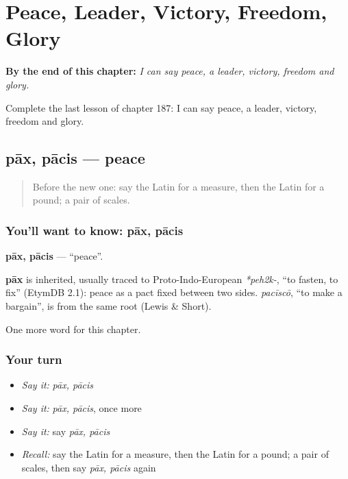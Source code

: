 
\chapter{Peace, Leader, Victory, Freedom, Glory}
\label{ch:la-peace-leader-victory-freedom-glory}

\begin{chapteropening}
\textbf{By the end of this chapter:} \emph{I can say peace, a leader, victory, freedom and glory.}

Complete the last lesson of chapter 187: I can say peace, a leader, victory, freedom and glory.
\end{chapteropening}

\section[pāx, pācis]{pāx, pācis — peace}

\label{lesson:LA-C187-pax}



\begin{quote}
Before the new one: say the Latin for a measure, then the Latin for a pound; a pair of scales.
\end{quote}

\subsection*{You'll want to know: pāx, pācis}
\textbf{pāx, pācis} — \textquotedblleft{}peace\textquotedblright{}.

\begin{cousinweb}
\textbf{pāx} is inherited, usually traced to Proto-Indo-European \emph{*peh2k-}, \textquotedblleft{}to fasten, to fix\textquotedblright{} (EtymDB 2.1): peace as a pact fixed between two sides. \emph{pacīscō}, \textquotedblleft{}to make a bargain\textquotedblright{}, is from the same root (Lewis \& Short).
\end{cousinweb}

\begin{grammarlens}[title={What you've built}]
One more word for this chapter.
\end{grammarlens}

\subsection*{Your turn}
\begin{itemize}
\raggedright
  \item \emph{Say it:} \emph{pāx, pācis}
  \item \emph{Say it:} \emph{pāx, pācis}, once more
  \item \emph{Say it:} say \emph{pāx, pācis}
  \item \emph{Recall:} say the Latin for a measure, then the Latin for a pound; a pair of scales, then say \emph{pāx, pācis} again
\end{itemize}

